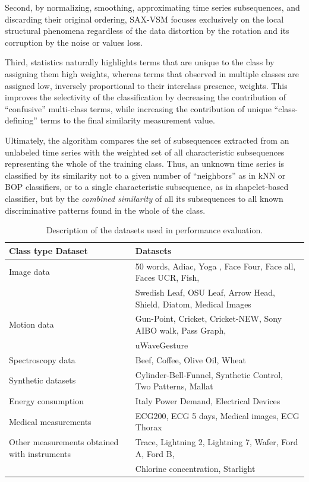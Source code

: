 Second, by normalizing, smoothing, approximating time series subsequences, and discarding their 
original ordering, SAX-VSM focuses exclusively on the local structural phenomena regardless of the 
data distortion by the rotation and its corruption by the noise or values loss.

Third,  \tfidf statistics naturally highlights terms that are unique to the class by assigning them high weights, 
whereas terms that observed in multiple classes are assigned low, 
inversely proportional to their interclass presence, weights. 
This improves the selectivity of the classification by decreasing the contribution of ``confusive'' multi-class terms, 
while increasing the contribution of unique ``class-defining'' terms to the final similarity measurement value.

Ultimately, the algorithm compares the set of subsequences extracted from an unlabeled time series 
with the weighted set of all characteristic subsequences representing the whole of the training class. 
Thus, an unknown time series is classified by its similarity not to a given number of 
``neighbors'' as in kNN or BOP classifiers, or to a single characteristic subsequence, as in shapelet-based classifier, 
but by the \textit{combined similarity} of all its subsequences to all known discriminative patterns found in the 
whole of the class.

\begin{table}[t]
\caption{Description of the datasets used in performance evaluation.}
\vspace{0.4cm}
 \label{data_typetable1}
\centering
{\setlength{\extrarowheight}{2pt}%
{\footnotesize
\begin{tabularx}{\linewidth}{@{} l l @{}}
\hline
Class type Dataset & Datasets \\[0.5ex]
\hline
Image data & 50 words, Adiac, Yoga , Face Four, Face all, Faces UCR, Fish, \\
 & Swedish Leaf, OSU Leaf, Arrow Head, Shield, Diatom, Medical Images \\[0.5ex]
Motion data & Gun-Point, Cricket, Cricket-NEW, Sony AIBO walk, Pass Graph, \\ 
 & uWaveGesture \\[0.5ex]
Spectroscopy data & Beef, Coffee, Olive Oil, Wheat \\[0.5ex]
Synthetic datasets & Cylinder-Bell-Funnel, Synthetic Control, Two Patterns, Mallat \\[0.5ex]
Energy consumption & Italy Power Demand, Electrical Devices \\[0.5ex]
Medical measurements & ECG200, ECG 5 days, Medical images, ECG Thorax \\[0.5ex]
Other measurements obtained with instruments & Trace, Lightning 2, Lightning 7, Wafer, Ford A, Ford B, \\
 & Chlorine concentration, Starlight \\[0.5ex]
\hline
\end{tabularx}
}}
\end{table}

